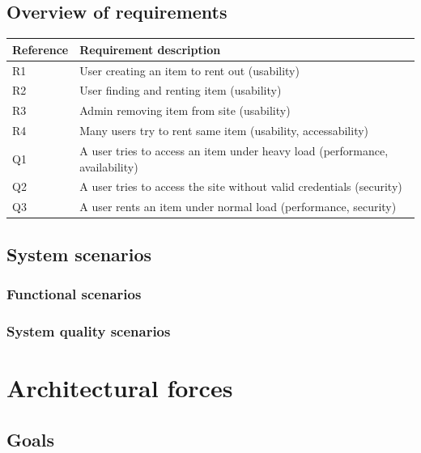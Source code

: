\documentclass[a4paper,11pt]{report}
\begin{document}
\section{Overview of requirements
}\label{sec:overv-requ}
\begin{center}
  \begin{tabular}[h]{| l |  l |}
    \hline
    \textbf{Reference} & \textbf{Requirement description} \\
    \hline
    R1 & User creating an item to rent out (usability)\\
    \hline
    R2 & User finding and renting item (usability)\\
    \hline
    R3 & Admin removing item from site (usability)\\
    \hline
    R4 & Many users try to rent same item (usability, accessability)\\
    \hline
    Q1 & A user tries to access an item under heavy load (performance, availability)\\
    \hline
    Q2 & A user tries to access the site without valid credentials (security)\\
    \hline
    Q3 & A user rents an item under normal load (performance, security)\\
    \hline
  \end{tabular}
\end{center}

\section{System scenarios}
\label{sec:system-scenarios}


\subsection{Functional scenarios}
\label{sec:functional-scenarios}


\subsection{System quality scenarios}
\label{sec:syst-qual-scen}


\chapter{Architectural forces}
\label{cha:architectural-forces}
\thispagestyle{fancy}

\section{Goals}
\label{sec:goals}
\end{document}
